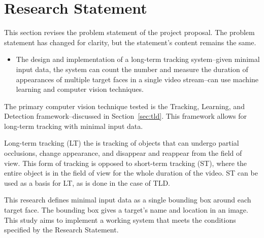 \section{Research Statement}
  This section revises the problem statement of the project proposal.
  The problem statement has changed for clarity, but the statement's content remains the same.
  \begin{itemize}
    \item
      The design and implementation of a long-term tracking system--given minimal input data, the system can count the number and measure the duration of appearances of multiple target faces in a single video stream--can use machine learning and computer vision techniques.
  \end{itemize}

  The primary computer vision technique tested is the Tracking, Learning, and Detection framework--discussed in Section~\ref{sec:tld}.
  This framework allows for long-term tracking with minimal input data. 
  
  Long-term tracking (LT) the is tracking of objects that can undergo partial occlusions, change appearance, and disappear and reappear from the field of view.
  This form of tracking is opposed to short-term tracking (ST), where the entire object is in the field of view for the whole duration of the video.
  ST can be used as a basis for LT, as is done in the case of TLD.

  This research defines minimal input data as a single bounding box around each target face.
  The bounding box gives a target's name and location in an image.
  This study aims to implement a working system that meets the conditions specified by the Research Statement.
